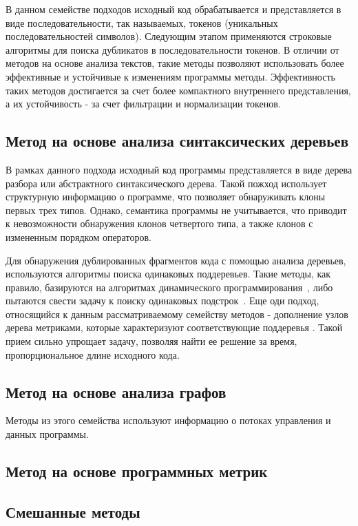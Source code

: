 В данном семействе подходов исходный код обрабатывается и представляется в виде последовательности, так называемых, токенов (уникальных последовательностей символов). Следующим этапом применяются строковые алгоритмы для поиска дубликатов в последовательности токенов. В отличии от методов на основе анализа текстов, такие методы позволяют использовать более эффективные и устойчивые к изменениям программы методы. Эффективность таких методов достигается за счет более компактного внутреннего представления, а их устойчивость - за счет фильтрации и нормализации токенов.

\subsection{Метод на основе анализа синтаксических деревьев}

В рамках данного подхода исходный код программы представляется в виде дерева разбора или абстрактного синтаксического дерева. Такой пожход использует структурную информацию о программе, что позволяет обнаруживать клоны первых трех типов. Однако, семантика программы не учитывается, что приводит к невозможности обнаружения клонов четвертого типа, а также клонов с измененным порядком операторов.

Для обнаружения дублированных фрагментов кода с помощью анализа деревьев, используются алгоритмы поиска одинаковых поддеревьев. Такие методы, как правило, базируются на алгоритмах динамического программирования~\cite{dynamicprog}, либо пытаются свести задачу к поиску одинаковых подстрок~\cite{substrings}. Еще оди подход, относящийся к данным рассматриваемому семейству методов - дополнение узлов дерева метриками, которые характеризуют соответствующие поддеревья	\cite{subtrees}. Такой прием сильно упрощает задачу, позволяя найти ее решение за время, пропорциональное длине исходного кода.

\subsection{Метод на основе анализа графов}

Методы из этого семейства используют информацию о потоках управления и данных программы. 

\subsection{Метод на основе программных метрик}



\subsection{Смешанные методы}



